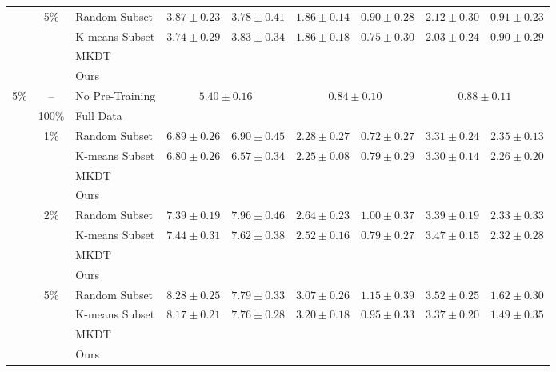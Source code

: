 \begin{table}[t]
{\begin{tabular}{@{}cclcccccc@{}}
& \multirow{4}{*}{5\%} & Random Subset
& $3.87 \pm 0.23$ & $3.78 \pm 0.41$
& $1.86 \pm 0.14$ & $0.90 \pm 0.28$
& $2.12 \pm 0.30$ & $0.91 \pm 0.23$ \\
& & K-means Subset
& $3.74 \pm 0.29$ & $3.83 \pm 0.34$
& $1.86 \pm 0.18$ & $0.75 \pm 0.30$
& $2.03 \pm 0.24$ & $0.90 \pm 0.29$ \\
& & MKDT & & & & & & \\
& & Ours
& &
& &
&  &  \\

\midrule

\multirow{14}{*}{5\%}
& -- & No Pre-Training
& \multicolumn{2}{c}{$5.40 \pm 0.16$}
& \multicolumn{2}{c}{$0.84 \pm 0.10$}
& \multicolumn{2}{c}{$0.88 \pm 0.11$} \\
\cmidrule(lr){2-9}

& 100\% & Full Data
&  & 
&  & 
&  &  \\
\cmidrule(lr){2-9}

& \multirow{4}{*}{1\%} & Random Subset
& $6.89 \pm 0.26$ & $6.90 \pm 0.45$
& $2.28 \pm 0.27$ & $0.72 \pm 0.27$
& $3.31 \pm 0.24$ & $2.35 \pm 0.13$ \\
& & K-means Subset
& $6.80 \pm 0.26$ & $6.57 \pm 0.34$
& $2.25 \pm 0.08$ & $0.79 \pm 0.29$
& $3.30 \pm 0.14$ & $2.26 \pm 0.20$ \\
& & MKDT & & & & & & \\
& & Ours
& &
& &
& & \\
\cmidrule(lr){2-9}

& \multirow{4}{*}{2\%} & Random Subset
& $7.39 \pm 0.19$ & $7.96 \pm 0.46$
& $2.64 \pm 0.23$ & $1.00 \pm 0.37$
& $3.39 \pm 0.19$ & $2.33 \pm 0.33$ \\
& & K-means Subset
& $7.44 \pm 0.31$ & $7.62 \pm 0.38$
& $2.52 \pm 0.16$ & $0.79 \pm 0.27$
& $3.47 \pm 0.15$ & $2.32 \pm 0.28$ \\
& & MKDT & & & & & & \\
& & Ours
& &
& &
&  &  \\
\cmidrule(lr){2-9}

& \multirow{4}{*}{5\%} & Random Subset
& $8.28 \pm 0.25$ & $7.79 \pm 0.33$
& $3.07 \pm 0.26$ & $1.15 \pm 0.39$
& $3.52 \pm 0.25$ & $1.62 \pm 0.30$ \\
& & K-means Subset
& $8.17 \pm 0.21$ & $7.76 \pm 0.28$
& $3.20 \pm 0.18$ & $0.95 \pm 0.33$
& $3.37 \pm 0.20$ & $1.49 \pm 0.35$ \\
& & MKDT & & & & & & \\
& & Ours
&  & 
& &
&  &  \\

\bottomrule
\end{tabular}%
}
\end{table}
